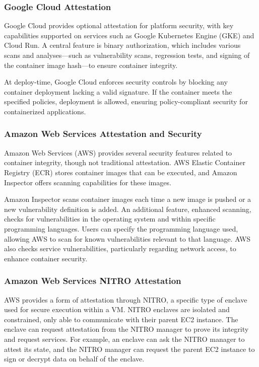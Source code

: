 \subsubsection{Google Cloud Attestation}

Google Cloud provides optional attestation for platform security, with
key capabilities supported on services such as Google Kubernetes
Engine (GKE) and Cloud Run. A central feature is binary authorization,
which includes various scans and analyses—such as vulnerability scans,
regression tests, and signing of the container image hash—to ensure
container integrity.

At deploy-time, Google Cloud enforces security controls by blocking
any container deployment lacking a valid signature. If the container
meets the specified policies, deployment is allowed, ensuring
policy-compliant security for containerized applications.

\subsubsection{Amazon Web Services Attestation and Security}

Amazon Web Services (AWS) provides several security features related
to container integrity, though not traditional attestation. AWS
Elastic Container Registry (ECR) stores container images that can be
executed, and Amazon Inspector offers scanning capabilities for these
images.

Amazon Inspector scans container images each time a new image is
pushed or a new vulnerability definition is added. An additional
feature, enhanced scanning, checks for vulnerabilities in the
operating system and within specific programming languages. Users can
specify the programming language used, allowing AWS to scan for known
vulnerabilities relevant to that language. AWS also checks service
vulnerabilities, particularly regarding network access, to enhance
container security.

\subsubsection{Amazon Web Services NITRO Attestation}

AWS provides a form of attestation through NITRO, a specific type of
enclave used for secure execution within a VM. NITRO enclaves are
isolated and constrained, only able to communicate with their parent
EC2 instance. The enclave can request attestation from the NITRO
manager to prove its integrity and request services. For example, an
enclave can ask the NITRO manager to attest its state, and the NITRO
manager can request the parent EC2 instance to sign or decrypt data on
behalf of the enclave.

